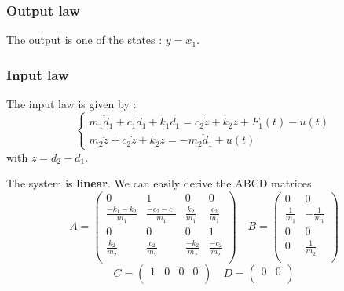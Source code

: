 \subsubsection{Output law}
The output is one of the states : $y = x_1$.

\subsubsection{Input law}
The input law is given by \cite{science_direct} :
$$
\begin{cases}
    m_{1}\ddot{d}_{1} + c_{1}\dot{d}_{1} + k_{1}d_{1} = c_{2}\dot{z} + k_{2}z + F_{1}(t) - u(t)\\
    m_{2}\ddot{z} + c_{2}\dot{z} + k_{2}z = -m_{2}\ddot{d}_{1} + u(t)
\end{cases}
$$
with $z = d_2 - d_1$.\par
The system is \textbf{linear}. We can easily derive the ABCD matrices.
$$
A = \begin{pmatrix}
    0 & 1 & 0 & 0 \\
    \frac{-k_1-k_2}{m_1} & \frac{-c_2-c_1}{m_1} & \frac{k_2}{m_1} & \frac{c_2}{m_1} \\
    0 & 0 & 0 & 1 \\ 
    \frac{k_2}{m_2} & \frac{c_2}{m_2} & \frac{-k_2}{m_2} & \frac{-c_2}{m_2}\\
\end{pmatrix}
\quad
B = \begin{pmatrix}
    0 & 0\\
    \frac{1}{m_1} & -\frac{1}{m_1}\\
    0 & 0\\
    0 & \frac{1}{m_2}\\
\end{pmatrix}
$$
$$
C = \begin{pmatrix}
    1 & 0 & 0 & 0\\
\end{pmatrix}
\quad
D = \begin{pmatrix}
    0 & 0\\
\end{pmatrix}
$$
